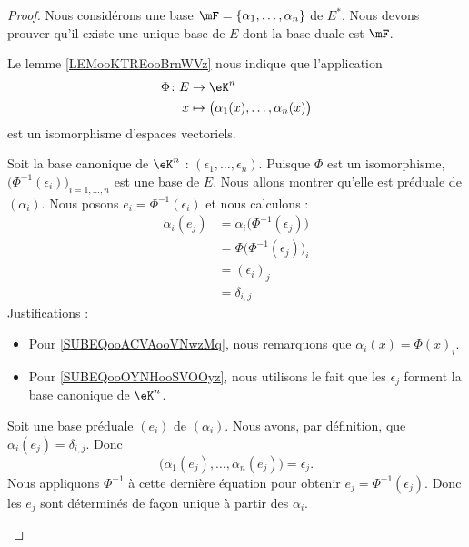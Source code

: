 \begin{proof}
	Nous considérons une base \( \mF=\{ \alpha_1,\ldots,\alpha_n \}\) de \( E^*\). Nous devons prouver qu'il existe une unique base de \( E\) dont la base duale est \( \mF\).

	\begin{subproof}
		\spitem[Existence]
		Le lemme \ref{LEMooKTREooBrnWVz} nous indique que l'application
		\begin{equation}
			\begin{aligned}
				\Phi\colon  E & \to \eK^n                                           \\
				x             & \mapsto \big( \alpha_1(x),\ldots, \alpha_n(x) \big)
			\end{aligned}
		\end{equation}
		est un isomorphisme d'espaces vectoriels.

		Soit la base canonique de \( \eK^n\) : \( (\epsilon_1,\ldots, \epsilon_n)\). Puisque \( \Phi\) est un isomorphisme, \( \big( \Phi^{-1}(\epsilon_i) \big)_{i=1,\ldots, n}\) est une base de \( E\). Nous allons montrer qu'elle est préduale de \( (\alpha_i)\). Nous posons \( e_i=\Phi^{-1}(\epsilon_i)\) et nous calculons :
		\begin{subequations}
			\begin{align}
				\alpha_i(e_j) & =\alpha_i\big( \Phi^{-1}(\epsilon_j) \big)                                  \\
				              & =\Phi\big( \Phi^{-1}(\epsilon_j) \big)_i        \label{SUBEQooACVAooVNwzMq} \\
				              & =(\epsilon_i)_j                                                             \\
				              & =\delta_{i,j}                                   \label{SUBEQooOYNHooSVOOyz}
			\end{align}
		\end{subequations}
		Justifications :
		\begin{itemize}
			\item Pour \ref{SUBEQooACVAooVNwzMq}, nous remarquons que \( \alpha_i(x)=\Phi(x)_i\).
			\item Pour \ref{SUBEQooOYNHooSVOOyz}, nous utilisons le fait que les \( \epsilon_j\) forment la base canonique de \( \eK^n\).
		\end{itemize}

		\spitem[Unicité]
		Soit une base préduale \( (e_i)\) de \( (\alpha_i)\). Nous avons, par définition, que \( \alpha_i(e_j)=\delta_{i,j}\). Donc
		\begin{equation}
			\big( \alpha_1(e_j),\ldots, \alpha_n(e_j) \big)=\epsilon_j.
		\end{equation}
		Nous appliquons \( \Phi^{-1}\) à cette dernière équation pour obtenir \( e_j=\Phi^{-1}(\epsilon_j)\). Donc les \( e_j\) sont déterminés de façon unique à partir des \( \alpha_i\).
	\end{subproof}
\end{proof}

